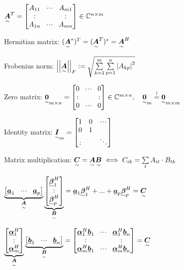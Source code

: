 $\ma{A}^T=\begin{bmatrix}A_{11}&\shdots&A_{m1}\\\svdots& &\svdots\\A_{1n} & \shdots& A_{mn}\end{bmatrix} \in \mathbb{C}^{n\times m}$

Hermitian matrix: $(\underset{\sim}{\boldsymbol {A}}^*)^T=(\underset{\sim}{\boldsymbol {A}}^T)^*=\underset{\sim}{\boldsymbol {A}}^H$

Frobenius norm: $\left|\left| \underset{\sim}{\boldsymbol {A}}\right|\right|_F := \sqrt{\sum\limits_{k=1}^m\sum\limits_{p=1}^n \left|A_{kp}\right|^2}$

Zero matrix: $\ma{0}_{m\times n}=\begin{bmatrix}0&\shdots&0\\\svdots&&\svdots\\0&\shdots&0\end{bmatrix}\in \mathbb{C}^{m\times n},\quad \ma{0}_m \overset{!}{=}\ma{0}_{m\times m}$

Identity matrix: $\underset{\sim}{\boldsymbol {I}}_m=\begin{bmatrix}1&0&\!\cdot \!\cdot\!\cdot\!\\0&1& \\:& &\ddots\end{bmatrix}$

Matrix multiplication: $\underset{\sim}{\boldsymbol {C}}=\underset{\sim}{\boldsymbol {A}}\underset{\sim}{\boldsymbol {B}} \iff C_{ik}=\sum\limits_{t}A_{it}\cdot B_{tk}$

$\underbrace{\begin{bmatrix}\underline{\boldsymbol {a}}_1&\!\cdot \!\cdot\!\cdot\!&\underline{\boldsymbol {a}}_p\end{bmatrix}}_{\underset{\sim}{\boldsymbol {A}}}
\underbrace{\begin{bmatrix}\underline{\boldsymbol {\beta}}_1^H\\:\\\underline{\boldsymbol {\beta}}_p^H\end{bmatrix}}_{\underset{\sim}{\boldsymbol {B}}}=
\underline{\boldsymbol {a}}_1\underline{\boldsymbol {\beta}}_1^H+...+\underline{\boldsymbol {a}}_p\underline{\boldsymbol {\beta}}_p^H=\underset{\sim}{\boldsymbol {C}}$

$\underbrace{\begin{bmatrix}\vec{\alpha}_1^H\\\svdots\\\vec{\alpha}_m^H\end{bmatrix}}_{\ma{A}}
\underbrace{\begin{bmatrix}\vec{b}_1&\shdots&\vec{b}_n\end{bmatrix}}_{\ma{B}} =
\begin{bmatrix}\vec{\alpha}_1^H\vec{b}_1&\shdots&\vec{\alpha}_1^H\vec{b}_n\\
\svdots& &\svdots\\
\vec{\alpha}_m^H\vec{b}_1&\shdots&\vec{\alpha}_m^H\vec{b}_n\end{bmatrix}=\ma{C}$

